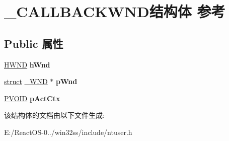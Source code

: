 \hypertarget{struct___c_a_l_l_b_a_c_k_w_n_d}{}\section{\+\_\+\+C\+A\+L\+L\+B\+A\+C\+K\+W\+N\+D结构体 参考}
\label{struct___c_a_l_l_b_a_c_k_w_n_d}
\subsection*{Public 属性}
\begin{DoxyCompactItemize}
\item 
\mbox{\label{struct___c_a_l_l_b_a_c_k_w_n_d_a8cb5004cfbe3fe730138c6e150a7ab99}} 
\hyperlink{interfacevoid}{H\+W\+ND} {\bfseries h\+Wnd}
\item 
\mbox{\label{struct___c_a_l_l_b_a_c_k_w_n_d_a9bfb5bcb472b5a6f0a8f745ef09f97c9}} 
\hyperlink{interfacestruct}{struct} \hyperlink{struct___w_n_d}{\+\_\+\+W\+ND} $\ast$ {\bfseries p\+Wnd}
\item 
\mbox{\label{struct___c_a_l_l_b_a_c_k_w_n_d_a109a19d38f286b4c5caf2be31da9aead}} 
\hyperlink{interfacevoid}{P\+V\+O\+ID} {\bfseries p\+Act\+Ctx}
\end{DoxyCompactItemize}


该结构体的文档由以下文件生成\+:\begin{DoxyCompactItemize}
\item 
E\+:/\+React\+O\+S-\/0../win32ss/include/ntuser.\+h\end{DoxyCompactItemize}
